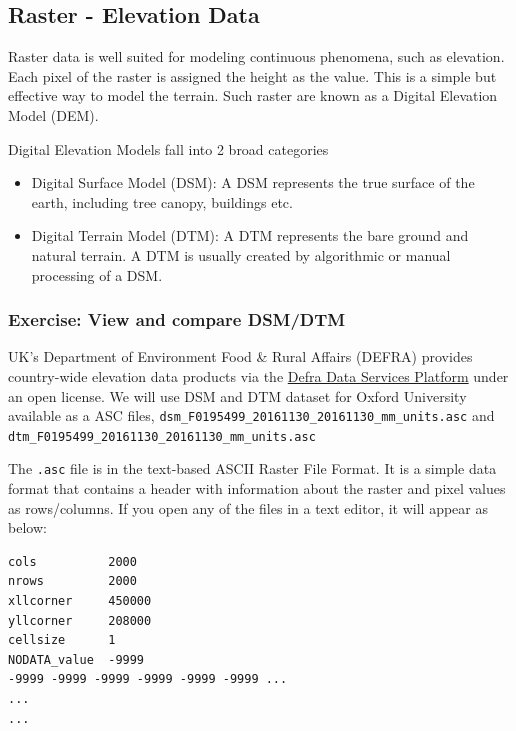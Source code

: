 \documentclass[
  12pt,
  a4paper]{article}
\providecommand{\tightlist}{%
  \setlength{\itemsep}{0pt}\setlength{\parskip}{0pt}}
\begin{document}
\newpage

\hypertarget{raster---elevation-data}{%
\subsection{Raster - Elevation Data}\label{raster---elevation-data}}

Raster data is well suited for modeling continuous phenomena, such as
elevation. Each pixel of the raster is assigned the height as the value.
This is a simple but effective way to model the terrain. Such raster are
known as a Digital Elevation Model (DEM).

Digital Elevation Models fall into 2 broad categories

\begin{itemize}
\tightlist
\item
  Digital Surface Model (DSM): A DSM represents the true surface of the
  earth, including tree canopy, buildings etc.
\item
  Digital Terrain Model (DTM): A DTM represents the bare ground and
  natural terrain. A DTM is usually created by algorithmic or manual
  processing of a DSM.
\end{itemize}

\hypertarget{exercise-view-and-compare-dsmdtm}{%
\subsubsection{Exercise: View and compare
DSM/DTM}\label{exercise-view-and-compare-dsmdtm}}

UK's Department of Environment Food \& Rural Affairs (DEFRA) provides
country-wide elevation data products via the
\href{https://environment.data.gov.uk/}{Defra Data Services Platform}
under an open license. We will use DSM and DTM dataset for Oxford
University available as a ASC files,
\texttt{dsm\_F0195499\_20161130\_20161130\_mm\_units.asc} and
\texttt{dtm\_F0195499\_20161130\_20161130\_mm\_units.asc}

The \texttt{.asc} file is in the text-based ASCII Raster File Format. It
is a simple data format that contains a header with information about
the raster and pixel values as rows/columns. If you open any of the
files in a text editor, it will appear as below:

\begin{verbatim}
cols          2000
nrows         2000
xllcorner     450000
yllcorner     208000
cellsize      1
NODATA_value  -9999
-9999 -9999 -9999 -9999 -9999 -9999 ...
...
...
\end{verbatim}
\end{document}
